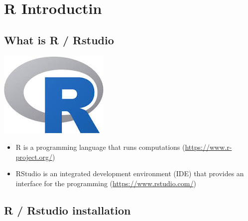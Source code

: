 \documentclass[]{book}
\providecommand{\tightlist}{%
  \setlength{\itemsep}{0pt}\setlength{\parskip}{0pt}}
\begin{document}
\hypertarget{r-introductin}{%
\chapter{R Introductin}\label{r-introductin}}

\hypertarget{what-is-r-rstudio}{%
\section{What is R / Rstudio}\label{what-is-r-rstudio}}

\includegraphics{images/r.jpg}

\begin{itemize}
\tightlist
\item
  R is a programming language that runs computations (\url{https://www.r-project.org/})
\item
  RStudio is an integrated development environment (IDE) that provides an interface for the programming (\url{https://www.rstudio.com/})
\end{itemize}

\hypertarget{r-rstudio-installation}{%
\section{R / Rstudio installation}\label{r-rstudio-installation}}
\end{document}
